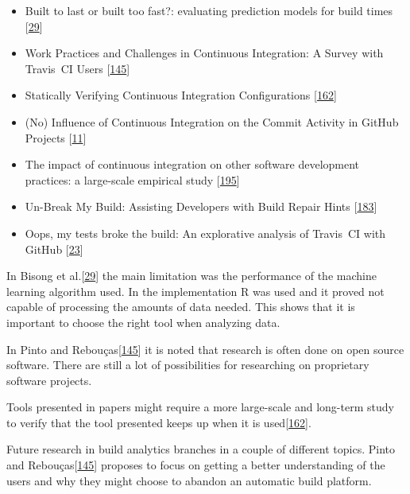 \documentclass[]{book}
\providecommand{\tightlist}{%
  \setlength{\itemsep}{0pt}\setlength{\parskip}{0pt}}
\begin{document}
\begin{itemize}
\tightlist
\item
  Built to last or built too fast?: evaluating prediction models for
  build times {[}\protect\hyperlink{ref-bisong2017built}{29}{]}
\item
  Work Practices and Challenges in Continuous Integration: A Survey with
  Travis~CI Users {[}\protect\hyperlink{ref-pinto2018work}{145}{]}
\item
  Statically Verifying Continuous Integration Configurations
  {[}\protect\hyperlink{ref-santolucito2018statically}{162}{]}
\item
  (No) Influence of Continuous Integration on the Commit Activity in
  GitHub Projects {[}\protect\hyperlink{ref-baltes2018no}{11}{]}
\item
  The impact of continuous integration on other software development
  practices: a large-scale empirical study
  {[}\protect\hyperlink{ref-zhao2017impact}{195}{]}
\item
  Un-Break My Build: Assisting Developers with Build Repair Hints
  {[}\protect\hyperlink{ref-vassallo2018break}{183}{]}
\item
  Oops, my tests broke the build: An explorative analysis of Travis~CI
  with GitHub {[}\protect\hyperlink{ref-beller2017oops}{23}{]}
\end{itemize}

In Bisong et al.{[}\protect\hyperlink{ref-bisong2017built}{29}{]} the
main limitation was the performance of the machine learning algorithm
used. In the implementation R was used and it proved not capable of
processing the amounts of data needed. This shows that it is important
to choose the right tool when analyzing data.

In Pinto and Rebouças{[}\protect\hyperlink{ref-pinto2018work}{145}{]} it
is noted that research is often done on open source software. There are
still a lot of possibilities for researching on proprietary software
projects.

Tools presented in papers might require a more large-scale and long-term
study to verify that the tool presented keeps up when it is
used{[}\protect\hyperlink{ref-santolucito2018statically}{162}{]}.

Future research in build analytics branches in a couple of different
topics. Pinto and
Rebouças{[}\protect\hyperlink{ref-pinto2018work}{145}{]} proposes to
focus on getting a better understanding of the users and why they might
choose to abandon an automatic build platform.
\end{document}
